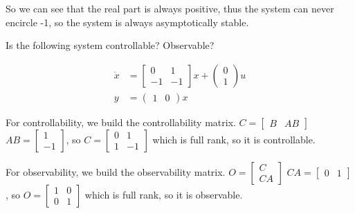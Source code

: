\documentclass[11pt]{article}
\begin{document}
So we can see that the real part is always positive, thus the system can never encircle -1,
so the system is always asymptotically stable.

Is the following system controllable? Observable?

\begin{align*}
    \dot{x} &= \begin{bmatrix}
        0 & 1 \\ -1 & -1
    \end{bmatrix} x + \begin{pmatrix}
        0 \\ 1
    \end{pmatrix} u \\
    y &= \begin{pmatrix}
        1 & 0
    \end{pmatrix} x
\end{align*}

\soln

For controllability, we build the controllability matrix.
$C = \begin{bmatrix}
    B & AB
\end{bmatrix}$
$AB = \begin{bmatrix}
    1 \\ -1
\end{bmatrix}$, so $C = \begin{bmatrix}
    0 & 1 \\ 1 & -1
\end{bmatrix}$
which is full rank, so it is controllable.

For observability, we build the observability matrix.
$O = \begin{bmatrix}
    C \\ CA
\end{bmatrix}$
$CA = \begin{bmatrix}
    0 & 1 \end{bmatrix}$, so $O = \begin{bmatrix}
    1 & 0 \\ 0 & 1 \end{bmatrix}$
which is full rank, so it is observable.
\end{document}
